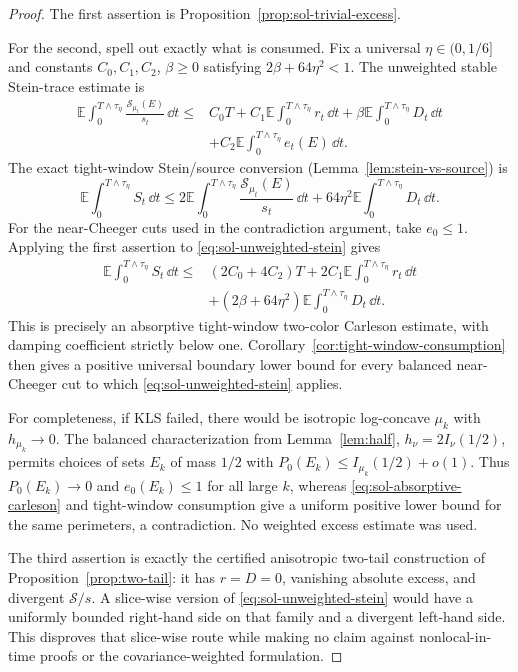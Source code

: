 \documentclass[../main.tex]{subfiles}
\begin{document}
\begin{proof}
The first assertion is Proposition~\ref{prop:sol-trivial-excess}.

For the second, spell out exactly what is consumed.  Fix a universal
$\eta\in(0,1/6]$ and constants $C_0,C_1,C_2$, $\beta\geq0$ satisfying
$2\beta+64\eta^2<1$.  The unweighted stable Stein-trace estimate is
\begin{equation}
\begin{split}
  \mathbb E\int_0^{T\wedge\tau_\eta}
       \frac{\mathcal S_{\mu_t}(E)}{s_t}\,\dd t
  \leq{}&C_0T+C_1\mathbb E\int_0^{T\wedge\tau_\eta}r_t\,\dd t
       +\beta\mathbb E\int_0^{T\wedge\tau_\eta}D_t\,\dd t\\
  &+C_2\mathbb E\int_0^{T\wedge\tau_\eta}e_t(E)\,\dd t .
\end{split}
\label{eq:sol-unweighted-stein}
\end{equation}
The exact tight-window Stein/source conversion
(Lemma~\ref{lem:stein-vs-source}) is
\[
  \mathbb E\int_0^{T\wedge\tau_\eta}S_t\,\dd t
  \leq2\mathbb E\int_0^{T\wedge\tau_\eta}
          \frac{\mathcal S_{\mu_t}(E)}{s_t}\,\dd t
       +64\eta^2\mathbb E\int_0^{T\wedge\tau_\eta}D_t\,\dd t.
\]
For the near-Cheeger cuts used in the contradiction argument, take $e_0\leq1$.  Applying the
first assertion to \eqref{eq:sol-unweighted-stein} gives
\[
\begin{split}
  \mathbb E\int_0^{T\wedge\tau_\eta}S_t\,\dd t
  \leq{}&(2C_0+4C_2)T
       +2C_1\mathbb E\int_0^{T\wedge\tau_\eta}r_t\,\dd t\\
       &+(2\beta+64\eta^2)
         \mathbb E\int_0^{T\wedge\tau_\eta}D_t\,\dd t.
\end{split}
\label{eq:sol-absorptive-carleson}
\]
This is precisely an absorptive tight-window two-color Carleson estimate, with damping
coefficient strictly below one.  Corollary~\ref{cor:tight-window-consumption} then gives a
positive universal boundary lower bound for every balanced near-Cheeger cut to which
\eqref{eq:sol-unweighted-stein} applies.

For completeness, if KLS failed, there would be isotropic log-concave $\mu_k$ with
$h_{\mu_k}\to0$.  The balanced characterization from Lemma~\ref{lem:half},
$h_\nu=2I_\nu(1/2)$, permits choices of sets $E_k$ of mass $1/2$ with
$P_0(E_k)\leq I_{\mu_k}(1/2)+o(1)$.  Thus $P_0(E_k)\to0$ and $e_0(E_k)\leq1$ for all large
$k$, whereas \eqref{eq:sol-absorptive-carleson} and tight-window consumption give a uniform
positive lower bound for the same perimeters, a contradiction.  No weighted excess estimate
was used.

The third assertion is exactly the certified anisotropic two-tail construction of
Proposition~\ref{prop:two-tail}: it has $r=D=0$, vanishing absolute excess, and divergent
$\mathcal S/s$.  A slice-wise version of \eqref{eq:sol-unweighted-stein} would have a uniformly
bounded right-hand side on that family and a divergent left-hand side.  This disproves that
slice-wise route while making no claim against nonlocal-in-time proofs or the covariance-weighted
formulation.
\end{proof}
\end{document}
